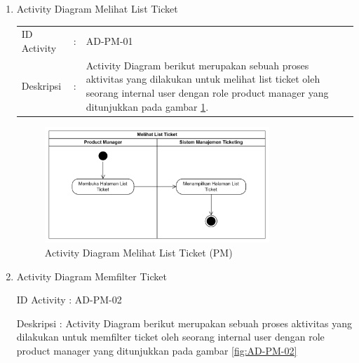 \documentclass[12pt]{article}
\begin{document}
\begin{enumerate}[label=\textbf{4.\arabic*.}]
\begin{enumerate} [label=\textbf{4.2.\arabic*.}, wide, labelwidth=!, labelindent=0pt]
\begin{enumerate}[label=\textbf{4.2.1.\arabic*.}, wide, labelwidth=!, labelindent=0pt]
            \begin{enumerate}[label=\arabic*.,wide,labelindent=27pt]
                \item Activity Diagram Melihat List Ticket
                
                \begin{tabularx}{.9\linewidth}{@{} l l X @{}}
                    \noindent ID Activity & : & AD-PM-01 \\
                    \noindent Deskripsi & : &  Activity Diagram berikut merupakan sebuah proses aktivitas yang dilakukan untuk melihat list ticket oleh seorang internal user dengan role product manager yang ditunjukkan pada gambar \ref{fig:AD-PM-01}.
                \end{tabularx}
                

                \begin{figure}[H]
                    \centering \includegraphics[width=0.8\textwidth]{images/activity/ipm/Melihat List Ticket.png}
                    \caption{Activity Diagram Melihat List Ticket (PM)}
                    \label{fig:AD-PM-01}
                \end{figure}

                \item Activity Diagram Memfilter Ticket
                
                \noindent ID Activity \quad : AD-PM-02

                \noindent Deskripsi	\quad : Activity Diagram berikut merupakan sebuah proses aktivitas yang dilakukan untuk memfilter ticket oleh seorang internal user dengan role product manager yang ditunjukkan pada gambar \ref{fig:AD-PM-02}


\end{enumerate}
\end{enumerate}
\end{enumerate}
\end{enumerate}
\end{document}
